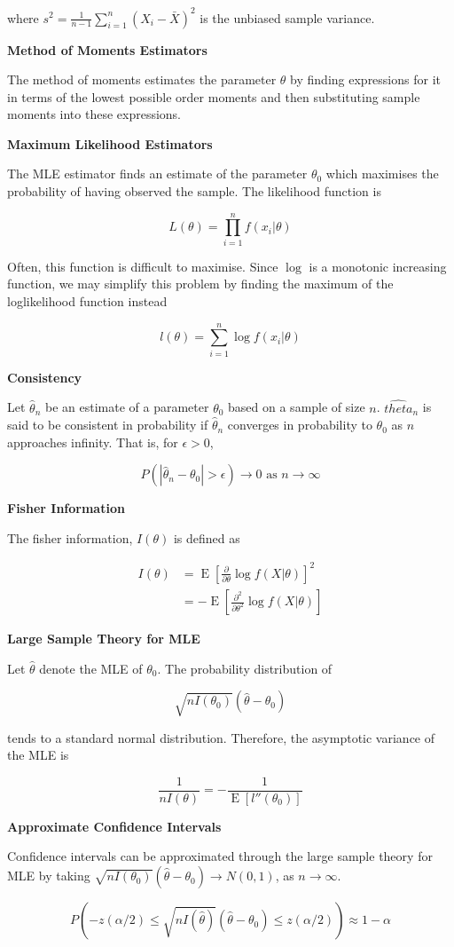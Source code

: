 \documentclass[a4paper]{article}
\newcommand{\subheading}[1]{{\scriptsize\textbf{#1}}}
\newcommand{\expectation}[1]{\operatorname{E}[#1]}
\begin{document}
\begin{multicols*}{4}
where $s^2 = \frac{1}{n-1}\sum^n_{i=1}(X_i - \bar{X})^2$ is the unbiased sample
variance. \smallskip

\subheading{Method of Moments Estimators}

The method of moments estimates the parameter $\theta$ by finding expressions
for it in terms of the lowest possible order moments and then substituting
sample moments into these expressions. \smallskip

\subheading{Maximum Likelihood Estimators}

The MLE estimator finds an estimate of the parameter $\theta_0$ which maximises
the probability of having observed the sample. The likelihood function is

$$L(\theta) = \prod^n_{i=1} f(x_i|\theta)$$

Often, this function is difficult to maximise. Since $\log$ is a monotonic
increasing function, we may simplify this problem by finding the maximum of the
loglikelihood function instead

$$l(\theta) = \sum^n_{i=1} \log f(x_i|\theta)$$

\subheading{Consistency}

Let $\hat{\theta}_n$ be an estimate of a parameter $\theta_0$ based on a sample
of size $n$. $\hat{theta}_n$ is said to be consistent in probability if
$\hat{\theta}_n$ converges in probability to $\theta_0$ as $n$ approaches
infinity. That is, for $\epsilon > 0$,

$$P(|\hat{\theta}_n - \theta_0| > \epsilon) \rightarrow 0 \text{ as } n
\rightarrow \infty$$

\subheading{Fisher Information}

The fisher information, $I(\theta)$ is defined as

\begin{align*}
  I(\theta) &= \operatorname{E} \left [
    \frac{\partial}{\partial\theta} \log f(X|\theta)
  \right ]^2 \\
    &= - \operatorname{E} \left [
      \frac{\partial^2}{\partial\theta^2} \log f(X|\theta)
  \right ]
\end{align*}

\subheading{Large Sample Theory for MLE}

Let $\hat{\theta}$ denote the MLE of $\theta_0$. The probability distribution of

$$\sqrt{nI(\theta_0)}(\hat{\theta} - \theta_0)$$

tends to a standard normal distribution. Therefore, the asymptotic variance of
the MLE is

$$\frac{1}{nI(\theta)} = - \frac{1}{\expectation{l''(\theta_0)}}$$

\subheading{Approximate Confidence Intervals}

Confidence intervals can be approximated through the large sample theory for MLE
by taking $\sqrt{nI(\theta_0)}(\hat{\theta}-\theta_0) \rightarrow N(0, 1)$, as
$n \rightarrow \infty$. \smallskip

$$P \left (
  -z(\alpha/2) \leq
  \sqrt{nI(\hat{\theta})}(\hat{\theta} - \theta_0) \leq
  z(\alpha/2)
\right ) \approx 1 - \alpha$$

\end{multicols*}
\end{document}
